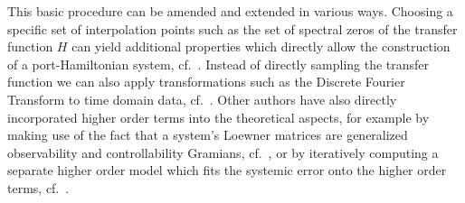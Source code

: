 This basic procedure can be amended and extended in various ways.
Choosing a specific set of interpolation points such as the set of spectral zeros of the transfer function $H$ can yield additional properties which directly allow the construction of a port-Hamiltonian system, cf.~\cite{BGD2020, Poussot2022}.
Instead of directly sampling the transfer function we can also apply transformations such as the Discrete Fourier Transform to time domain data, cf.~\cite{Peherstorfer2017, Cherifi2021}.
Other authors have also directly incorporated higher order terms into the theoretical aspects, for example by making use of the fact that a system's Loewner matrices are generalized observability and controllability Gramians, cf.~\cite{Antoulas2019}, or by iteratively computing a separate higher order model which fits the systemic error onto the higher order terms, cf.~\cite{GKA2021}.



